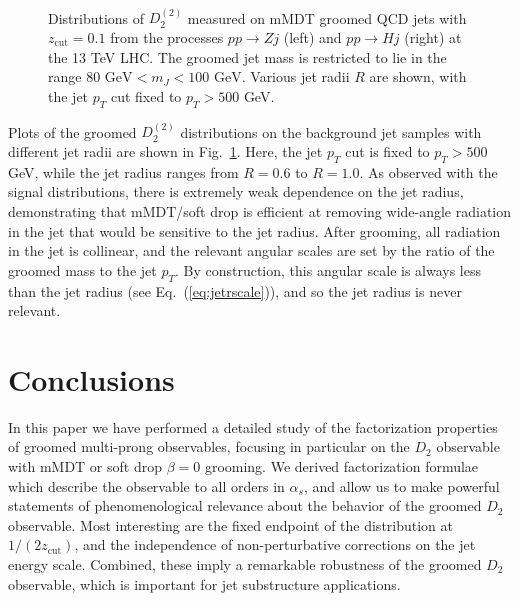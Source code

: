 \documentclass[a4paper,11pt]{article}
\def\zcut{z_{\text{cut}}}
\newcommand{\Dobs}[2]{D_{#1}^{(#2)}}
\DeclareRobustCommand{\Fig}[1]{Fig.~\ref{#1}}
\DeclareRobustCommand{\Eq}[1]{Eq.~(\ref{#1})}
\begin{document}
\begin{figure}
\begin{center}
\ \ 
\end{center}
\caption{
Distributions of $\Dobs{2}{2}$ measured on mMDT groomed QCD jets with $\zcut = 0.1$ from the processes $pp\to Zj$ (left) and $pp\to Hj$ (right) at the 13 TeV LHC.  The groomed jet mass is restricted to lie in the range  $80\text{ GeV} < m_J < 100\text{ GeV}$.  Various jet radii $R$ are shown, with the jet $p_T$ cut fixed to $p_T> 500$ GeV.
}
\label{fig:ppjRplots}
\end{figure}

Plots of the groomed $\Dobs{2}{2}$ distributions on the background jet samples with different jet radii are shown in \Fig{fig:ppjRplots}.  Here, the jet $p_T$ cut is fixed to $p_T > 500$ GeV, while the jet radius ranges from $R = 0.6$ to $R = 1.0$.  As observed with the signal distributions, there is extremely weak dependence on the jet radius, demonstrating that mMDT/soft drop is efficient at removing wide-angle radiation in the jet that would be sensitive to the jet radius.  After grooming, all radiation in the jet is collinear, and the relevant angular scales are set by the ratio of the groomed mass to the jet $p_T$.  By construction, this angular scale is always less than the jet radius (see \Eq{eq:jetrscale}), and so the jet radius is never relevant.




\section{Conclusions}\label{sec:conc}

In this paper we have performed a detailed study of the factorization properties of groomed multi-prong observables, focusing in particular on the $D_2$ observable with mMDT or soft drop $\beta=0$ grooming. We derived factorization formulae which describe the observable to all orders in $\alpha_s$, and allow us to make powerful statements of phenomenological relevance about the behavior of the groomed $D_2$ observable.  Most interesting are the fixed endpoint of the distribution at $1/(2\zcut)$, and the independence of non-perturbative corrections on the jet energy scale. Combined, these imply a remarkable robustness of the groomed $D_2$ observable, which is important for jet substructure applications.
\end{document}
